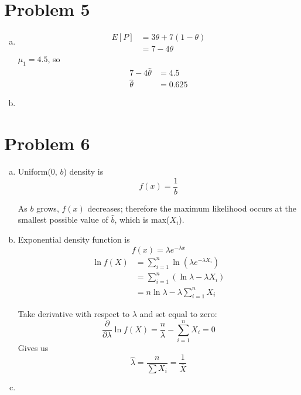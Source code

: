 \documentclass[11pt]{article}
\begin{document}
\section*{Problem 5}

\begin{enumerate}[(a)]
	\item
		\begin{align*}
			E[P] &= 3\theta + 7(1- \theta) \\
			&= 7 - 4\theta
		\end{align*}
		$\mu_1 = 4.5$, so
		\begin{align*}
			7-4\hat{\theta} &= 4.5 \\
			\hat{\theta} &= 0.625
		\end{align*}

	\item

\end{enumerate}


\section*{Problem 6}

\begin{enumerate}[(a)]
	\item Uniform(0, $b$) density is 
	\[ f(x) = \frac{1}{b}\]

	As $b$ grows, $f(x)$ decreases; therefore the maximum likelihood occurs at the smallest possible value of $\hat{b}$, which is max($X_i$).

	\item Exponential density function is 
	\[ f(x) = \lambda e ^{-\lambda x}\]
		\begin{align*}
			\ln f( X ) &= \sum \limits _{i=1} ^n \ln(\lambda e ^{-\lambda X_i} ) \\
			&= \sum \limits _{i=1} ^n (\ln \lambda - \lambda X_i) \\
			&= n \ln \lambda - \lambda \sum \limits _{i=1} ^n X_i
		\end{align*}

	Take derivative with respect to $\lambda$ and set equal to zero:
	\[ \frac{\partial}{\partial \lambda} \ln f(X) = \frac{n}{\lambda} - \sum \limits _{i=1} ^n X_i = 0 \]
	Gives us
	\[ \hat{\lambda} = \frac{n}{\sum X_i} = \frac{ 1}{\bar{X}} \]

	\item 

\end{enumerate}
\end{document}
